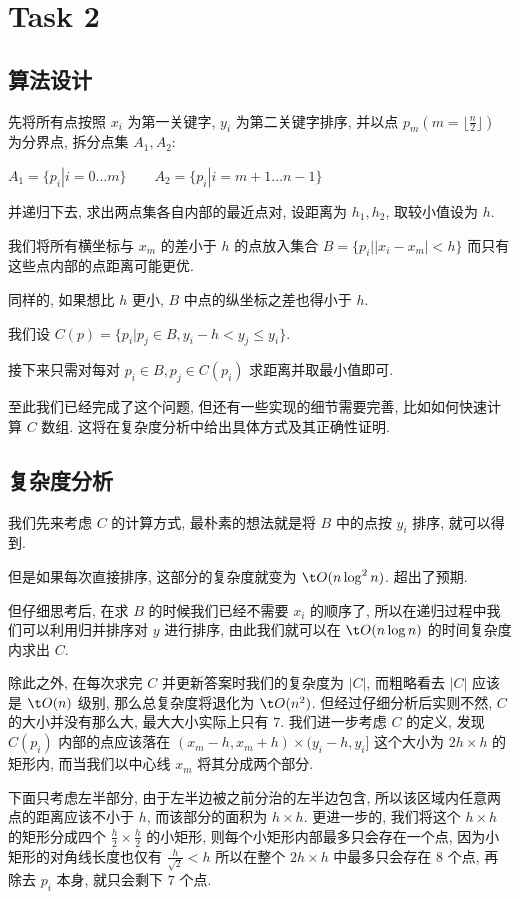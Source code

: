 \section{Task 2}

\subsection{算法设计}

先将所有点按照 $x_i$ 为第一关键字, $y_i$ 为第二关键字排序, 并以点 $p_m(m=\lfloor\frac n 2\rfloor)$ 为分界点, 拆分点集 $A_1,A_2$:

$A_1=\{p_i|i=0\ldots m\} \qquad A_2=\{p_i|i=m+1\ldots n-1\}$

并递归下去, 求出两点集各自内部的最近点对, 设距离为 $h_1,h_2$, 取较小值设为 $h$.

我们将所有横坐标与 $x_m$ 的差小于 $h$ 的点放入集合 $B=\{p_i| |x_i-x_m|<h \}$ 而只有这些点内部的点距离可能更优. 

同样的, 如果想比 $h$ 更小, $B$ 中点的纵坐标之差也得小于 $h$.

我们设 $C(p)=\{p_i|p_j\in B,y_i-h<y_j\le y_i\}$.

接下来只需对每对 $p_i\in B,p_j\in C(p_i)$ 求距离并取最小值即可.

至此我们已经完成了这个问题, 但还有一些实现的细节需要完善, 比如如何快速计算 $C$ 数组. 这将在复杂度分析中给出具体方式及其正确性证明.

\subsection{复杂度分析}

我们先来考虑 $C$ 的计算方式, 最朴素的想法就是将 $B$ 中的点按 $y_i$ 排序, 就可以得到.

但是如果每次直接排序, 这部分的复杂度就变为 $\t O(n\log ^2 n)$. 超出了预期.

但仔细思考后, 在求 $B$ 的时候我们已经不需要 $x_i$ 的顺序了, 所以在递归过程中我们可以利用归并排序对 $y$ 进行排序, 由此我们就可以在 $\t O(n\log n)$ 的时间复杂度内求出 $C$.

除此之外, 在每次求完 $C$ 并更新答案时我们的复杂度为 $|C|$, 而粗略看去 $|C|$ 应该是 $\t O(n)$ 级别, 那么总复杂度将退化为 $\t O(n^2)$. 但经过仔细分析后实则不然, $C$ 的大小并没有那么大, 最大大小实际上只有 $7$. 我们进一步考虑 $C$ 的定义, 发现 $C(p_i)$ 内部的点应该落在 $(x_m-h,x_m+h) \times (y_i-h,y_i]$ 这个大小为 $2h\times h$ 的矩形内, 而当我们以中心线 $x_m$ 将其分成两个部分. 

下面只考虑左半部分, 由于左半边被之前分治的左半边包含, 所以该区域内任意两点的距离应该不小于 $h$, 而该部分的面积为 $h\times h$. 更进一步的, 我们将这个 $h\times h$ 的矩形分成四个 $\frac h 2 \times \frac h 2$ 的小矩形, 则每个小矩形内部最多只会存在一个点, 因为小矩形的对角线长度也仅有 $\frac {h} {\sqrt 2}<h$ 所以在整个 $2h\times h$ 中最多只会存在 $8$ 个点, 再除去 $p_i$ 本身, 就只会剩下 $7$ 个点.

